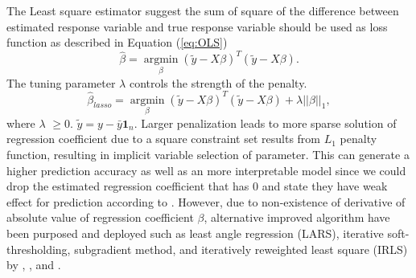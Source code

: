 The Least square estimator suggest the sum of square of the difference between estimated response variable and true response variable should be used as loss function as described in Equation (\ref{eq:OLS})
\begin{equation}
	\label{eq:OLS}
	\hat{\beta} = \underset{\beta}{\operatorname{argmin}}  (\tilde{y} - X\beta)^T(\tilde{y}-X\beta).
\end{equation}
The tuning parameter $\lambda$ controls the strength of the penalty.
 \begin{equation}
 	\label{eq:lasso1}
 	\hat{\beta}_{lasso} = \underset{\beta}{\operatorname{argmin}} (\tilde{y}-X\beta)^T(\tilde{y}-X\beta) + \lambda ||\beta||_1,
 \end{equation}
where $\lambda$ $\geq 0$. $\tilde{y} =  y - \bar{y}\textbf{1}_n$. Larger penalization leads to more sparse solution of regression coefficient due to a square constraint set results from $L_1$ penalty function, resulting in implicit variable selection of parameter. This can generate a higher prediction accuracy as well as an more interpretable model since we could drop the estimated regression coefficient that has 0 and state they have weak effect for prediction according to \cite{tibshirani_1996}.
However, due to non-existence of derivative of absolute value of regression coefficient $\beta$, alternative improved algorithm have been purposed and deployed such as least angle regression (LARS), iterative soft-thresholding, subgradient method, and iteratively reweighted least square (IRLS) by \cite{efron_hastie_johnstone_tibshirani_2004},   \cite{beck_teboulle_2009}, \cite{nan_zhang_shuqing_zeng_2005} and \cite{friedman_hastie_tibshirani_2010}.

